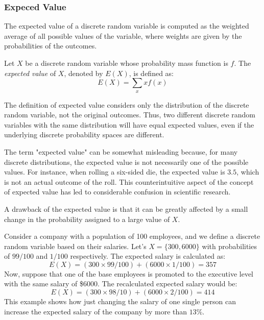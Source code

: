 
\subsubsection*{Expeced Value}

The expected value of a discrete random variable is computed as the weighted average of all possible values of the variable, where weights are given by the probabilities of the outcomes.

\begin{definition}\label{probability:expectation}
Let $X$ be a discrete random variable whose probability mass function is $f$. The \emph{expected value} of $X$, denoted by $E\left(X\right)$, is defined as:
\[
E\left(X\right)=\sum_{x}xf\left(x\right)
\]
\end{definition}

The definition of expected value considers only the distribution of the discrete random variable, not the original outcomes. Thus, two different discrete random variables with the same distribution will have equal expected values, even if the underlying discrete probability spaces are different.

The term "expected value" can be somewhat misleading because, for many discrete distributions, the expected value is not necessarily one of the possible values. For instance, when rolling a six-sided die, the expected value is \(3.5\), which is not an actual outcome of the roll. This counterintuitive aspect of the concept of expected value has led to considerable confusion in scientific research.

A drawback of the expected value is that it can be greatly affected by a small change in the probability assigned to a large value of $X$.

\begin{example}\label{ex:expected_salary}
Consider a company with a population of 100 employees, and we define a discrete random variable based on their salaries. Let's $X = \{300, 6000\}$ with probabilities of $99/100$ and $1/100$ respectively. The expected salary is calculated as:
\[ 
E\left(X\right) = (300 \times 99/100) + (6000 \times 1/100) = 357
\]
Now, suppose that one of the base employees is promoted to the executive level with the same salary of \$6000. The recalculated expected salary would be:
\[
E\left(X\right) = (300 \times 98/10) + (6000 \times 2/100) = 414
\]
This example shows how just changing the salary of one single person can increase the expected salary of the company by more than $13\%$.
\end{example}


